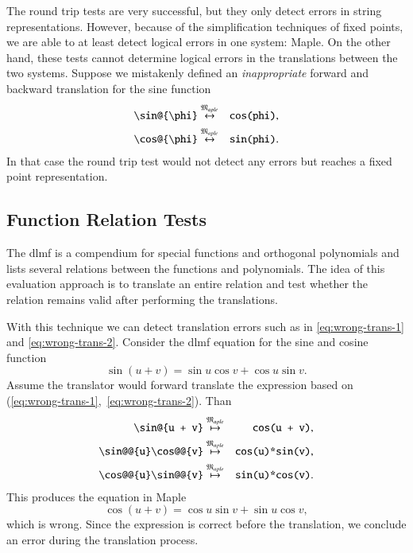 \documentclass[a4paper,11pt]{article}
\newcommand{\Maple}{Maple}
\newcommand{\langMaple}{\mathfrak{M}_{aple}}
\theoremstyle{defTheoStyle}
\theoremstyle{defExampStyle}
\begin{document}
The round trip tests are very successful, but they only detect errors in string representations. However, because of the simplification techniques of fixed points, we are able to at least detect logical errors in one system: \Maple. On the other hand, these tests cannot determine logical errors in the translations between the two systems. Suppose we mistakenly defined an \textit{inappropriate} forward and backward translation for the sine function
\begin{eqnarray}
\verb|\sin@{\phi}| & \overset{\langMaple}{\leftrightarrow} & \verb|cos(phi)|,\label{eq:wrong-trans-1}\\
\verb|\cos@{\phi}| & \overset{\langMaple}{\leftrightarrow} & \verb|sin(phi)|.\label{eq:wrong-trans-2}
\end{eqnarray}
In that case the round trip test would not detect any errors but reaches a fixed point representation.

\subsection{Function Relation Tests}\label{sec:relation-tests}
The \gls*{dlmf} is a compendium for special functions and orthogonal polynomials and lists several relations between the functions and polynomials. The idea of this evaluation approach is to translate an entire relation and test whether the relation remains valid after performing the translations.

With this technique we can detect translation errors such as in \eqref{eq:wrong-trans-1} and \eqref{eq:wrong-trans-2}. Consider the \gls*{dlmf} equation for the sine and cosine function~\parencite[(4.21.2)]{NIST:DLMF}
\begin{equation}
\sin \left(u+v\right) = \sin{u}\cos{v} + \cos{u}\sin{v}.
\end{equation}
Assume the translator would forward translate the expression based on (\ref{eq:wrong-trans-1},~\ref{eq:wrong-trans-2}). Than
\begin{eqnarray}
\verb|\sin@{u + v}| & \overset{\langMaple}{\mapsto} & \verb|cos(u + v)|,\\
\verb|\sin@@{u}\cos@@{v}| & \overset{\langMaple}{\mapsto} & \verb|cos(u)*sin(v)|,\\
\verb|\cos@@{u}\sin@@{v}| & \overset{\langMaple}{\mapsto} & \verb|sin(u)*cos(v)|.
\end{eqnarray}
This produces the equation in \Maple
\begin{equation}
\cos\left(u+v\right) = \cos{u}\sin{v} + \sin{u}\cos{v},
\end{equation}
which is wrong. Since the expression is correct before the translation, we conclude an error during the translation process.
\end{document}
